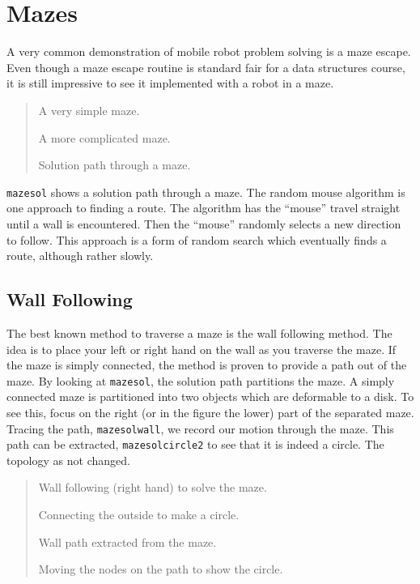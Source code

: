 \hypertarget{mazes}{%
\section{Mazes}\label{mazes}}

A very common demonstration of mobile robot problem solving is a maze
escape. Even though a maze escape routine is standard fair for a data
structures course, it is still impressive to see it implemented with a
robot in a maze.

\begin{quote}
A very simple maze.

A more complicated maze.

Solution path through a maze.
\end{quote}

\texttt{mazesol} shows a solution path through a maze. The random mouse
algorithm is one approach to finding a route. The algorithm has the
``mouse'' travel straight until a wall is encountered. Then the
``mouse'' randomly selects a new direction to follow. This approach is a
form of random search which eventually finds a route, although rather
slowly.

\hypertarget{wall-following}{%
\subsection{Wall Following}\label{wall-following}}

The best known method to traverse a maze is the wall following method.
The idea is to place your left or right hand on the wall as you traverse
the maze. If the maze is simply connected, the method is proven to
provide a path out of the maze. By looking at \texttt{mazesol}, the
solution path partitions the maze. A simply connected maze is
partitioned into two objects which are deformable to a disk. To see
this, focus on the right (or in the figure the lower) part of the
separated maze. Tracing the path, \texttt{mazesolwall}, we record our
motion through the maze. This path can be extracted,
\texttt{mazesolcircle2} to see that it is indeed a circle. The topology
as not changed.

\begin{quote}
Wall following (right hand) to solve the maze.

Connecting the outside to make a circle.

Wall path extracted from the maze.

Moving the nodes on the path to show the circle.
\end{quote}

